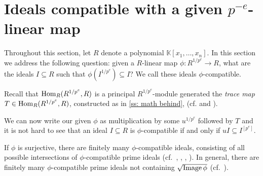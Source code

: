 \documentclass{amsart}
\renewcommand{\leq}{\leqslant}
\begin{document}
\medskip
{\small
{}
}\medskip

\section{Ideals compatible with a given $p^{-e}$-linear map}\label{Section: compatible ideals}

Throughout this section, let $R$ denote a polynomial $\mathbb{K}[x_1, \dots, x_n]$.
In this section we address the following question:
given a $R$-linear map $\phi: R^{1/p^e} \rightarrow R$, what are the ideals $I\subseteq R$ such that $\phi(I^{1/p^e})\subseteq I$?
We call these ideals $\phi$-compatible.

Recall that  $\operatorname{Hom}_R( R^{1/p^e}, R)$  is a principal $R^{1/p^e}$-module generated
the \emph{trace map} $T\in \operatorname{Hom}_R(R^{1/p^e}, R)$, constructed as in \autoref{ss: math behind}, (cf. \cite[Lemma 1.6]{FedderFPureRat} and \cite[Example 1.3.1]{BrionKumarFrobeniusSplitting}).
%
%

We can now write our given $\phi$ as multiplication by some $u^{1/p^e}$ followed by $T$ and it is not hard to see that
an ideal $I\subseteq R$ is $\phi$-compatible if and only if $u I \subseteq I^{[p^e]}$.

\begin{theorem}\label{Theorem: finitely many compatible primes}
If $\phi$ is surjective, there are finitely many $\phi$-compatible ideals, consisting of all possible intersections
of $\phi$-compatible prime ideals \textup(cf.\ \cite{KumarMehtaFiniteness}, \cite{SchwedeFAdjunction},
\cite{SharpGradedAnnihilatorsOfModulesOverTheFrobeniusSkewPolynomialRing}, \cite{EnescuHochsterTheFrobeniusStructureOfLocalCohomology}\textup).
In general, there are finitely many $\phi$-compatible prime ideals not containing $\sqrt{\operatorname{Image} \phi}$ \textup(cf.\ \cite{KatzmanSchwedeAlgorithm}\textup).

\end{theorem}
\end{document}
